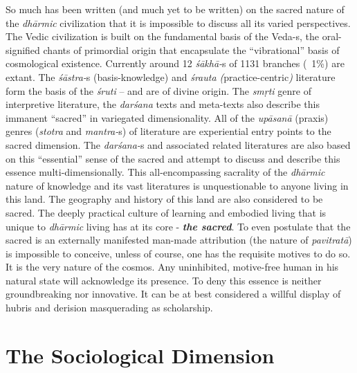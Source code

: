 So much has been written (and much yet to be written) on the sacred nature of the \textit{dhārmic} civilization that it is impossible to discuss all its varied perspectives. The Vedic civilization is built on the fundamental basis of the Veda-s, the oral-signified chants of primordial origin that encapsulate the “vibrational” basis of cosmological existence. Currently around 12 \textit{śākhā-}s of 1131 branches (~1\%) are extant. The \textit{śāstra-}s (basis-knowledge) and \textit{śrauta (}practice-centric\textit{)} literature form the basis of the \textit{śruti} – and are of divine origin. The \textit{smṛti} genre of interpretive literature, the \textit{darśana} texts and meta-texts also describe this immanent “sacred” in variegated dimensionality. All of the \textit{upāsanā} (praxis) genres (\textit{stotra} and \textit{mantra-}s) of literature are experiential entry points to the sacred dimension. The \textit{darśana-}s and associated related literatures are also based on this “essential” sense of the sacred and attempt to discuss and describe this essence multi-dimensionally. This all-encompassing sacrality of the \textit{dhārmic} nature of knowledge and its vast literatures is unquestionable to anyone living in this land. The geography and history of this land are also considered to be sacred. The deeply practical culture of learning and embodied living that is unique to \textit{dhārmic} living has at its core - \textbf{\textit{the sacred}}. To even postulate that the sacred is an externally manifested man-made attribution (the nature of \textit{pavitratā}) is impossible to conceive, unless of course, one has the requisite motives to do so. It is the very nature of the cosmos. Any uninhibited, motive-free human in his natural state will acknowledge its presence. To deny this essence is neither groundbreaking nor innovative. It can be at best considered a willful display of hubris and derision masquerading as scholarship.

\newpage


\section*{The Sociological Dimension}

